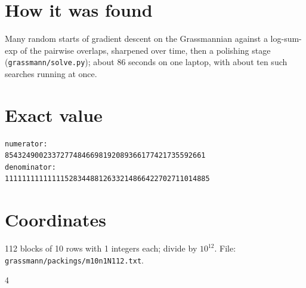 \documentclass[11pt,a4paper]{article}
\begin{document}
\section{How it was found}
Many random starts of gradient descent on the Grassmannian against a log-sum-exp of the pairwise overlaps, sharpened over time, then a polishing stage (\texttt{grassmann/solve.py}); about 86 seconds on one laptop, with about ten such searches running at once.


\appendix
\section{Exact value}
{\small
\begin{verbatim}
numerator:
85432490023372774846698192089366177421735592661
denominator:
111111111111115283448812633214866422702711014885
\end{verbatim}}

\section{Coordinates}
112 blocks of 10 rows with 1 integers each; divide by $10^{12}$. File: \texttt{grassmann/packings/m10n1N112.txt}.
{\tiny
\begin{multicols}{4}
\end{multicols}}
\end{document}
